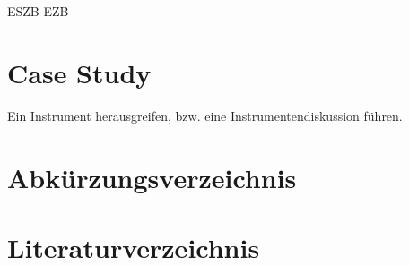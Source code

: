 \documentclass[
        onecolumn,
        a4paper,
        abstracton,
        parskip=half
        ,final
        ]{scrartcl}
\begin{document}
\clearpage
\ac{ESZB}
\ac{EZB}



\section{Case Study}
\label{sec4:CaseStudy}
Ein Instrument herausgreifen, bzw. eine Instrumentendiskussion f{\"u}hren.





\clearpage

\section{Abk{\"u}rzungsverzeichnis}
\label{sec5:Abkuerzungsverzeichnis}

\begin{acronym}[ESZB]





\end{acronym}

\vspace{10pt}
	\newpage
  \singlespacing



\section{Literaturverzeichnis}
  \label{sec6:Literaturverzeichnis}
  \newpage





%
\end{document}
